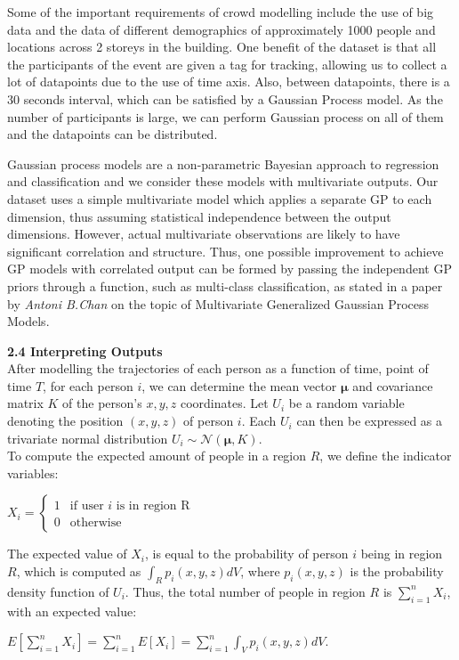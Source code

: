 \documentclass[letterpaper]{article}
\begin{document}
Some of the important requirements of crowd modelling include the use of big data and the data of different demographics of approximately 1000 people and locations across 2 storeys in the building. One benefit of the dataset is that all the participants of the event are given a tag for tracking, allowing us to collect a lot of datapoints due to the use of time axis. Also, between datapoints, there is a 30 seconds interval, which can be satisfied by a Gaussian Process model. As the number of participants is large, we can perform Gaussian process on all of them and the datapoints can be distributed. 

Gaussian process models are a non-parametric Bayesian approach to regression and classification and we consider these models with multivariate outputs. Our dataset uses a simple multivariate model which applies a separate GP to each dimension, thus assuming statistical independence between the output dimensions. However, actual multivariate observations are likely to have significant correlation and structure. Thus, one possible improvement to achieve GP models with correlated output can be formed by passing the independent GP priors through a function, such as multi-class classification, as stated in a paper by {\it Antoni B.Chan} on the topic of Multivariate Generalized Gaussian Process Models.


{\bf2.4  Interpreting  Outputs} \\

After modelling the trajectories of each person as a function of time, point of time $T$, for each person $i$, we can determine the mean vector $\boldsymbol{\mu}$ and covariance matrix $K$ of the person's $x,y,z$ coordinates. Let $U_i$ be a random variable denoting the position $(x,y,z)$ of person $i$. Each $U_i$ can then be expressed as a trivariate normal distribution $U_i \sim \mathcal{N}(\boldsymbol{\mu},K)$.\\

To compute the expected amount of people in a region $R$, we define the indicator variables:
\begin{center}
$X_i =
\begin{cases}
    1 &\text{if user }i\text{ is in region R}\\
    0 &\text{otherwise}
\end{cases}$
\end{center}
The expected value of $X_i$, is equal to the probability of person $i$ being in region $R$, which is computed as $\int_R p_i(x,y,z)dV$, where $p_i(x,y,z)$ is the probability density function of $U_i$. Thus, the total number of people in region $R$ is $\sum_{i=1}^n X_i$, with an expected value:
\begin{center}
$\displaystyle E[\sum_{i=1}^n X_i] = \sum_{i=1}^n E[X_i] = \sum_{i=1}^n \int_V p_i(x,y,z)dV$.
\end{center}
\end{document}
